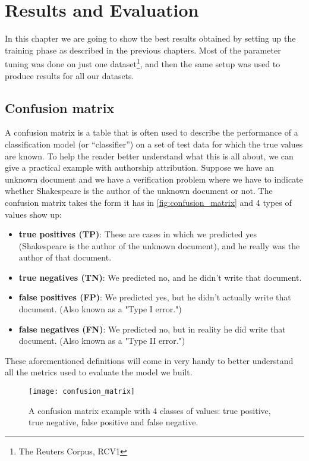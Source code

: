 \chapter{Results and Evaluation}
In this chapter we are going to show the best results obtained by setting up the training phase as described in the previous chapters. Most of the parameter tuning was done on just one dataset\footnote{The Reuters Corpus, RCV1}, and then the same setup was used to produce results for all our datasets.

\section{Confusion matrix}
A confusion matrix is a table that is often used to describe the performance of a classification model (or \enquote{classifier}) on a set of test data for which the true values are known.
To help the reader better understand what this is all about, we can give a practical example with authorship attribution. Suppose we have an unknown document and we have a verification problem where we have to indicate whether Shakespeare is the author of the unknown document or not.
The confusion matrix takes the form it has in \autoref{fig:confusion_matrix} and 4 types of values show up:

\begin{itemize}
	\item \textbf{true positives (TP)}: These are cases in which we predicted yes (Shakespeare is the author of the unknown document), and he really was the author of that document.
	\item \textbf{true negatives (TN)}: We predicted no, and he didn't write that document.
	\item \textbf{false positives (FP)}: We predicted yes, but he didn't actually write that document. (Also known as a "Type I error.")
	\item \textbf{false negatives (FN)}: We predicted no, but in reality he did write that document. (Also known as a "Type II error.")
\end{itemize}

These aforementioned definitions will come in very handy to better understand all the metrics used to evaluate the model we built.

\begin{figure}[ht]
	\centering
	\texttt{[image: confusion\_matrix]}
	\caption[Confusion matrix example]{A confusion matrix example with 4 classes of values: true positive, true negative, false positive and false negative.}
	\label{fig:confusion_matrix}
\end{figure}

